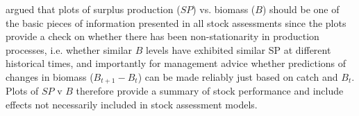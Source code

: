 \documentclass[12pt,doublespacing,a4paper]{ouparticle}
\begin{document}
\cite{walters2008surplus} argued that plots of surplus production ($SP$) vs. biomass ($B$) should be one of the basic pieces of information presented in all stock assessments since the plots provide a check on whether there has been non-stationarity in production processes, i.e. whether similar $B$ levels have exhibited similar SP at different historical times, and importantly for management advice whether predictions of changes in biomass ($B_{t+1} - B_t$) can be made reliably just based on catch and $B_t$. Plots of $SP$ v $B$ therefore provide a summary of stock performance and include effects not necessarily included in stock assessment models. 
 

\begin{itemize}[topsep=0pt,itemsep=0ex,partopsep=0ex,parsep=0ex]
\end{itemize}
\end{document}

